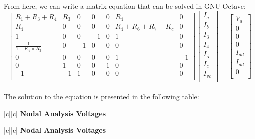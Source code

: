 \paragraph{}
From here, we can write a matrix equation that can be solved in GNU Octave:
\[
\begin{bmatrix}
R_1+R_3+R_4 & R_3 & 0 & 0 & 0 & R_4 & 0\\
R_4 & 0 & 0 & 0 & 0 & R_4+R_6+R_7-K_c & 0\\ 
1 & 0 & 0 & -1 & 0 & 1 & 0\\
\frac{1}{1-K_b \times R_3} & 0 & -1 & 0 & 0 & 0 & 0\\
0 & 0 & 0 & 0 & 0 & 1 & -1\\
0 & 1 & 0 & 0 & 1 & 0 & 0\\ 
-1 & -1 & 1 & 0 & 0 & 0 & 0\\ 
\end{bmatrix}
\begin{bmatrix}
I_a\\
I_b\\
I_3\\
I_4\\
I_5\\
I_c\\
I_{vc}\\
\end{bmatrix}
=
\begin{bmatrix}
V_a\\
0\\
0\\
0\\
I_{dd}\\
I_{dd}\\
0\\
\end{bmatrix}
\]

\paragraph{}
The solution to the equation is presented in the following table:

\begin{tabular}{|c||c|}
      \hline    
       {\bf Nodal Analysis Voltages} \\
      \hline

	
     
      \end{tabular}



   \begin{tabular}{|c||c|}
      \hline    
       {\bf Nodal Analysis Voltages} \\
      \hline

        
     
      \end{tabular}
 

